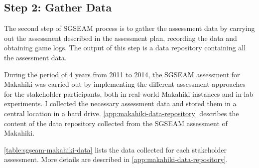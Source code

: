 \subsection{Step 2: Gather Data}

The second step of SGSEAM process is to gather the assessment data by carrying out the assessment described in the assessment plan, recording the data and obtaining game logs. The output of this step is a data repository containing all the assessment data. 

During the period of 4 years from 2011 to 2014, the SGSEAM assessment for Makahiki was carried out by implementing the different assessment approaches for the stakeholder participants, both in real-world Makahiki instances and in-lab experiments. I collected the necessary assessment data and stored them in a central location in a hard drive. \autoref{app:makahiki-data-repository} describes the content of the data repository collected from the SGSEAM assessment of Makahiki. 

\autoref{table:sgseam-makahiki-data} lists the data collected for each stakeholder assessment. More details are described in \autoref{app:makahiki-data-repository}.

